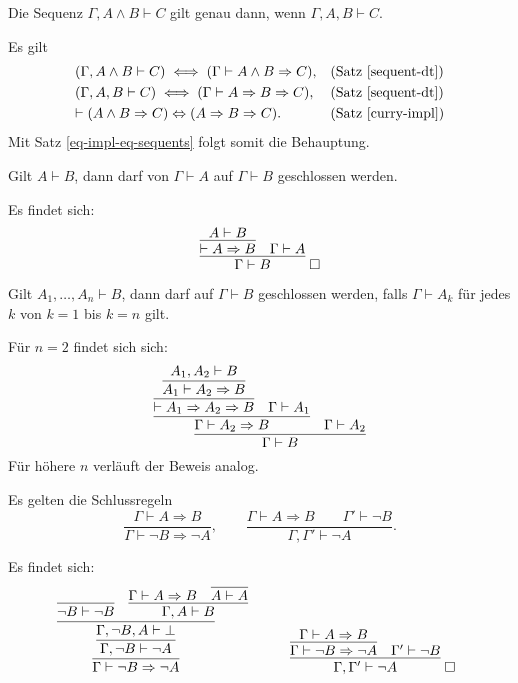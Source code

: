 \begin{Satz}
Die Sequenz $\Gamma, A\land B\vdash C$ gilt genau dann, wenn $\Gamma,A,B\vdash C$.
\end{Satz}
\begin{Beweis}
Es gilt
\begin{align*}
& (\Gamma, A\land B\vdash C)\iff (\Gamma\vdash A\land B\Rightarrow C),
  &&\text{(Satz \ref{sequent-dt})}\\
& (\Gamma,A,B\vdash C)\iff (\Gamma\vdash A\Rightarrow B\Rightarrow C),
  &&\text{(Satz \ref{sequent-dt})}\\
& {\vdash (A\land B\Rightarrow C)\Leftrightarrow (A\Rightarrow B\Rightarrow C)}.
  &&\text{(Satz \ref{curry-impl})}
\end{align*}
Mit Satz \ref{eq-impl-eq-sequents} folgt somit die Behauptung.\,\qedsymbol
\end{Beweis}

\begin{Satz}\newlinefirst
Gilt $A\vdash B$, dann darf von $\Gamma\vdash A$ auf $\Gamma\vdash B$
geschlossen werden.
\end{Satz}
\begin{Beweis} Es findet sich:
\[\infer{\Gamma\vdash B}{
  \infer{\vdash A\Rightarrow B}{A\vdash B}
  & \Gamma\vdash A}\;\qedsymbol\]
\end{Beweis}

\begin{Satz}\newlinefirst
Gilt $A_1,\ldots,A_n\vdash B$, dann darf auf $\Gamma\vdash B$
geschlossen werden, falls $\Gamma\vdash A_k$ für jedes $k$
von $k=1$ bis $k=n$ gilt.
\end{Satz}
\begin{Beweis} Für $n=2$ findet sich sich:
\[\infer{\Gamma\vdash B}{
  \infer{\Gamma\vdash A_2\Rightarrow B}{
    \infer{\vdash A_1\Rightarrow A_2\Rightarrow B}{
      \infer{A_1\vdash A_2\Rightarrow B}{A_1,A_2\vdash B}}
    & \Gamma\vdash A_1}
  & \Gamma\vdash A_2}\]
Für höhere $n$ verläuft der Beweis analog.\,\qedsymbol
\end{Beweis}

\newpage
\begin{Satz}%
\label{modus-tollens}
Es gelten die Schlussregeln
\[\dfrac{\Gamma\vdash A\Rightarrow B}{\Gamma\vdash\neg B\Rightarrow\neg A},\qquad
\dfrac{\Gamma\vdash A\Rightarrow B\qquad\Gamma'\vdash\neg B}{\Gamma,\Gamma'\vdash\neg A}.\]
\end{Satz}
\begin{Beweis} Es findet sich:
\[\begin{array}{@{}l@{\qquad\quad}l}
\infer{\Gamma\vdash\neg B\Rightarrow\neg A}{
  \infer{\Gamma,\neg B\vdash\neg A}{
    \infer{\Gamma,\neg B, A\vdash\bot}{
      \infer{\neg B\vdash\neg B}{}
      & \infer{\Gamma,A\vdash B}{
          \Gamma\vdash A\Rightarrow B
          & \infer{A\vdash A}{}}}}}
&
\infer{\Gamma,\Gamma'\vdash\neg A}{
  \infer{\Gamma\vdash\neg B\Rightarrow\neg A}{\Gamma\vdash A\Rightarrow B}
  & \Gamma'\vdash\neg B}\;\qedsymbol
\end{array}
\]
\end{Beweis}

